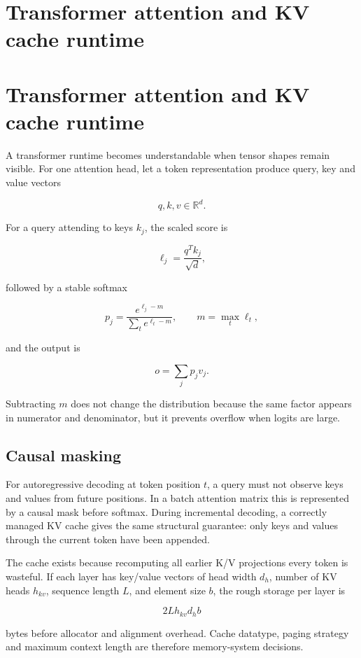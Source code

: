 \hypertarget{appendix-ea2dadd21ce5}{}
\section*{Transformer attention and KV cache runtime}
\section{Transformer attention and KV cache runtime}\label{transformer-attention-and-kv-cache-runtime}

A transformer runtime becomes understandable when tensor shapes remain visible. For one attention head, let a token representation produce query, key and value vectors

\[
q,k,v \in \mathbb{R}^{d}.
\]

For a query attending to keys \(k_j\), the scaled score is

\[
\ell_j = \frac{q^T k_j}{\sqrt{d}},
\]

followed by a stable softmax

\[
p_j = \frac{e^{\ell_j-m}}{\sum_t e^{\ell_t-m}},
\qquad m=\max_t \ell_t,
\]

and the output is

\[
o = \sum_j p_j v_j.
\]

Subtracting \(m\) does not change the distribution because the same factor appears in numerator and denominator, but it prevents overflow when logits are large.

\subsection{Causal masking}\label{causal-masking}

For autoregressive decoding at token position \(t\), a query must not observe keys and values from future positions. In a batch attention matrix this is represented by a causal mask before softmax. During incremental decoding, a correctly managed KV cache gives the same structural guarantee: only keys and values through the current token have been appended.

The cache exists because recomputing all earlier K/V projections every token is wasteful. If each layer has key/value vectors of head width \(d_h\), number of KV heads \(h_{kv}\), sequence length \(L\), and element size \(b\), the rough storage per layer is

\[
2 L h_{kv} d_h b
\]

bytes before allocator and alignment overhead. Cache datatype, paging strategy and maximum context length are therefore memory-system decisions.

